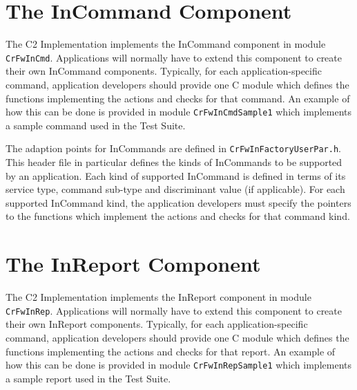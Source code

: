 \documentclass{pnp_article}
\begin{document}
\section{The InCommand Component}\label{sec:InCommand}


The C2 Implementation implements the InCommand component in module \texttt{CrFwInCmd}. Applications will normally have to extend this component to create their own InCommand components. Typically, for each application-specific command, application developers should provide one C module which defines the functions implementing the actions and checks for that command. An example of how this can be done is provided in module \texttt{CrFwInCmdSample1} which implements a sample command used in the Test Suite.

The adaption points for InCommands are defined in \texttt{CrFwInFactoryUserPar.h}. This header file in particular defines the kinds of InCommands to be supported by an application. Each kind of supported InCommand is defined in terms of its service type, command sub-type and discriminant value (if applicable). For each supported InCommand kind, the application developers must specify the pointers to the functions which implement the actions and checks for that command kind.



\section{The InReport Component}\label{sec:InReport}


The C2 Implementation implements the InReport component in module \texttt{CrFwInRep}. Applications will normally have to extend this component to create their own InReport components. Typically, for each application-specific command, application developers should provide one C module which defines the functions implementing the actions and checks for that report. An example of how this can be done is provided in module \texttt{CrFwInRepSample1} which implements a sample report used in the Test Suite.
\end{document}
